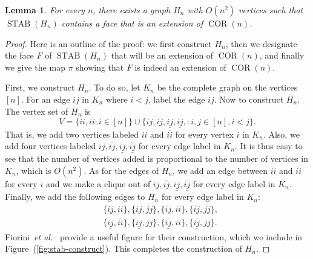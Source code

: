 \documentclass{article}
\makeatletter
\newtheorem{lemma}[theorem]{\sc Lemma}
\theoremstyle{definition}
\theoremstyle{remark}
\newcommand{\cetal}{\textit{et al.\@}}  %
\newcommand{\ol}[1]{\overline{#1}}
\newcommand{\ul}[1]{\underline{#1}}
\newcommand{\oul}[1]{\overline{\underline{#1}}}
\newcommand{\STAB}{\operatorname{STAB}}
\newcommand{\COR}{\operatorname{COR}}
\makeatother
\begin{document}
\begin{lemma}\label{lem:stab-reduct}
For every $n$, there exists a graph $H_n$ with $O(n^2)$ vertices such that $\STAB(H_n)$ contains a face that is an extension of $\COR(n)$.
\end{lemma}
\begin{proof}
Here is an outline of the proof: we first construct $H_n$, then we designate the face $F$ of $\STAB(H_n)$ that will be an extension of $\COR(n)$, and finally we give the map $\pi$ showing that $F$ is indeed an extension of $\COR(n)$.

First, we construct $H_n$. To do so, let $K_n$ be the complete graph on the vertices $[n]$. For an edge $ij$ in $K_n$ where $i < j$, label the edge $ij$. Now to construct $H_n$. The vertex set of $H_n$ is
\[
V = \{ii, \ol{ii} : i \in [n]\} \cup \{ij, \ol{ij}, \ul{ij}, \oul{ij}, : i,j \in [n], i < j\}.
\]
That is, we add two vertices labeled $ii$ and $\ol{ii}$ for every vertex $i$ in $K_n$. Also, we add four vertices labeled $ij, \ol{ij}, \ul{ij}, \oul{ij}$ for every edge label in $K_n$. It is thus easy to see that the number of vertices added is proportional to the number of vertices in $K_n$, which is $O(n^2)$. As for the edges of $H_n$, we add an edge between $ii$ and $\ol{ii}$ for every $i$ and we make a clique out of $ij, \ol{ij}, \ul{ij}, \oul{ij}$ for every edge label in $K_n$. Finally, we add the following edges to $H_n$ for every edge label in $K_n$:
\begin{align*}
&\{ij, \ol{ii}\}, \{ij, \ol{jj}\}, \{\ol{ij}, ii\}, \{\ol{ij}, \ol{jj}\},\\
&\{\ul{ij}, \ol{ii}\}, \{\ul{ij}, jj\}, \{\oul{ij}, ii\}, \{\oul{ij}, jj\}.
\end{align*}
Fiorini~\cetal~\cite{fiorini} provide a useful figure for their construction, which we include in Figure~(\ref{fig:stab-construct}). This completes the construction of $H_n$.


\end{proof}
\end{document}
